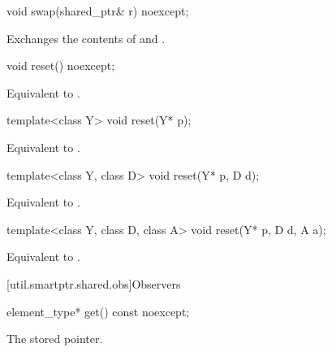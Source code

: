 %
\begin{itemdecl}
void swap(shared_ptr& r) noexcept;
\end{itemdecl}

\begin{itemdescr}

\pnum
\effects
Exchanges the contents of  and .
\end{itemdescr}

%
\begin{itemdecl}
void reset() noexcept;
\end{itemdecl}

\begin{itemdescr}
\pnum
\effects
Equivalent to .
\end{itemdescr}

%
\begin{itemdecl}
template<class Y> void reset(Y* p);
\end{itemdecl}

\begin{itemdescr}
\pnum
\effects
Equivalent to .
\end{itemdescr}

%
\begin{itemdecl}
template<class Y, class D> void reset(Y* p, D d);
\end{itemdecl}

\begin{itemdescr}
\pnum
\effects
Equivalent to .
\end{itemdescr}

%
\begin{itemdecl}
template<class Y, class D, class A> void reset(Y* p, D d, A a);
\end{itemdecl}

\begin{itemdescr}
\pnum
\effects
Equivalent to .
\end{itemdescr}

[util.smartptr.shared.obs]{Observers}
%
\begin{itemdecl}
element_type* get() const noexcept;
\end{itemdecl}

\begin{itemdescr}
\pnum
\returns
The stored pointer.
\end{itemdescr}

